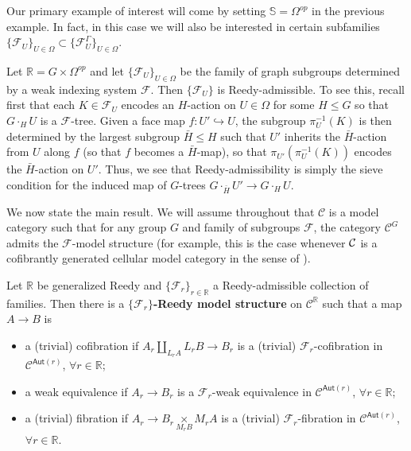 \documentclass[a4paper,10pt,draft]{article}%
\begin{document}
Our primary example of interest will come by setting
$\mathbb{S} = \Omega^{op}$ in the previous example.
In fact, in this case we will also be interested 
in certain subfamilies
$\{\mathcal{F}_U\}_{U \in \Omega}
\subset \{\mathcal{F}_U^{\Gamma}\}_{U \in \Omega}$.

\begin{example}
	Let $\mathbb{R} = G \times \Omega^{op}$ and let
	$\{\mathcal{F}_U\}_{U \in \Omega}$ be the family of graph subgroups determined by a weak indexing system $\mathcal{F}$.
	Then $\{\mathcal{F}_U\}$ is Reedy-admissible.
	To see this, recall first that each $K \in \mathcal{F}_U$ encodes 
	an $H$-action on $U \in \Omega$ for some $H \leq G$
	so that $G \cdot_H U$ is a $\mathcal{F}$-tree.
	Given a face map $f \colon U' \hookrightarrow U$, 
	the subgroup $\pi^{-1}_U(K)$ is then determined by the largest subgroup $\bar{H}\leq H$ such that 
	$U'$ inherits the $\bar{H}$-action from $U$ along $f$ (so that $f$ becomes a $\bar{H}$-map), 
	so that $\pi_{U'}(\pi^{-1}_U(K))$ encodes the $\bar{H}$-action on $U'$. Thus, we see that Reedy-admissibility is simply the sieve condition for the induced map of $G$-trees
	$G \cdot_{\bar{H}} U' \to G \cdot_H U$.
\end{example}

We now state the main result.
We will assume throughout that $\mathcal{C}$ is a model category such that for any group $G$ and family of subgroups $\mathcal{F}$,
the category $\mathcal{C}^G$ admits the
$\mathcal{F}$-model structure
(for example, this is the case whenever $\mathcal{C}$ is a cofibrantly generated cellular model category in the sense of \cite{Ste16}).


\begin{theorem}\label{REEDYADM THM}
Let $\mathbb{R}$ be generalized Reedy and 
$\{\mathcal{F}_r\}_{r \in \mathbb{R}}$ a Reedy-admissible collection of families. 
Then there is a \textbf{$\{\mathcal{F}_r\}$-Reedy model structure} on
$\mathcal{C}^{\mathbb{R}}$ such that a map $A \to B$ is
\begin{itemize}
  \item a (trivial) cofibration if $A_r \underset{L_r A}{\amalg}L_r B \to B_r$ is a (trivial) $\mathcal{F}_r$-cofibration in $\mathcal{C}^{\mathsf{Aut}(r)}$, $\forall r \in \mathbb{R}$;
	\item a weak equivalence if $A_r \to B_r$ is a $\mathcal{F}_r$-weak equivalence in $\mathcal{C}^{\mathsf{Aut}(r)}$, $\forall r \in \mathbb{R}$;
	\item a (trivial) fibration if $A_r \to B_r \underset{M_r B}{\times }M_r A $ is a (trivial) $\mathcal{F}_r$-fibration in $\mathcal{C}^{\mathsf{Aut}(r)}$, $\forall r \in \mathbb{R}$.
\end{itemize}
\end{theorem}
\end{document}
